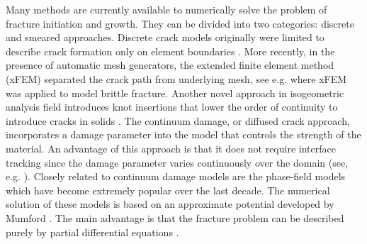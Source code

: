 \documentclass[11pt]{acmeArticle}
\numberwithin{equation}{section}
\begin{document}
Many methods are currently available to numerically solve the problem of fracture initiation and growth. They can be divided into two categories: discrete and smeared approaches. Discrete crack models originally were limited to describe crack formation only on element boundaries \citep{Scordelis1967}. More recently, in the presence of automatic mesh generators, the extended finite element method (xFEM) separated the crack path from underlying mesh, see e.g. \citep{Belytschko1999} where xFEM was applied to model brittle fracture. Another novel approach in isogeometric analysis field introduces knot insertions that lower the order of continuity to introduce cracks in solids \citep{Hosseini2014}. The continuum damage, or diffused crack approach, incorporates a damage parameter into the model that controls the strength of the material. An advantage of this approach is that it does not require interface tracking since the damage parameter varies continuously over the domain (see, e.g. \citep{deBorst2004}). Closely related to continuum damage models are the phase-field models which have become extremely popular over the last decade. The numerical solution of these models is based on an approximate potential developed by Mumford \citep{Mumford1989}. The main advantage is that the fracture problem can be described purely by partial differential equations \citep{Miehe2010a,Borst2014}. \\
\end{document}
